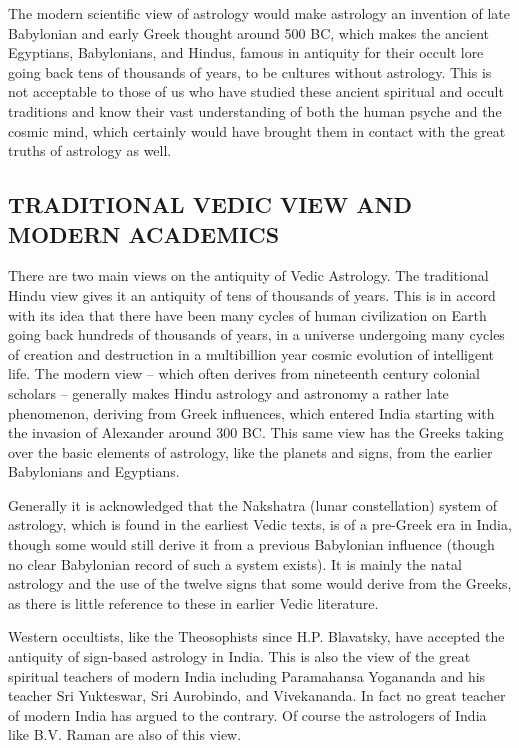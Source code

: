  

The modern scientific view of astrology would make astrology an invention of late Babylonian and early Greek thought around 500 BC, which makes the ancient Egyptians, Babylonians, and Hindus, famous in antiquity for their occult lore going back tens of thousands of years, to be cultures without astrology. This is not acceptable to those of us who have studied these ancient spiritual and occult traditions and know their vast understanding of both the human psyche and the cosmic mind, which certainly would have brought them in contact with the great truths of astrology as well.

 

\subsection{TRADITIONAL VEDIC VIEW AND MODERN ACADEMICS}

 



 

There are two main views on the antiquity of Vedic Astrology. The traditional Hindu view gives it an antiquity of tens of thousands of years. This is in accord with its idea that there have been many cycles of human civilization on Earth going back hundreds of thousands of years, in a universe undergoing many cycles of creation and destruction in a multibillion year cosmic evolution of intelligent life. The modern view – which often derives from nineteenth century colonial scholars – generally makes Hindu astrology and astronomy a rather late phenomenon, deriving from Greek influences, which entered India starting with the invasion of Alexander around 300 BC. This same view has the Greeks taking over the basic elements of astrology, like the planets and signs, from the earlier Babylonians and Egyptians.

 

Generally it is acknowledged that the Nakshatra (lunar constellation) system of astrology, which is found in the earliest Vedic texts, is of a pre-Greek era in India, though some would still derive it from a previous Babylonian influence (though no clear Babylonian record of such a system exists). It is mainly the natal astrology and the use of the twelve signs that some would derive from the Greeks, as there is little reference to these in earlier Vedic literature.

 

Western occultists, like the Theosophists since H.P. Blavatsky, have accepted the antiquity of sign-based astrology in India. This is also the view of the great spiritual teachers of modern India including Paramahansa Yogananda and his teacher Sri Yukteswar, Sri Aurobindo, and Vivekananda. In fact no great teacher of modern India has argued to the contrary. Of course the astrologers of India like B.V. Raman are also of this view.

